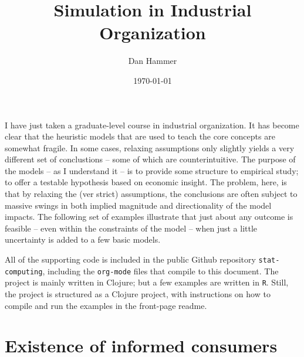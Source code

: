 \documentclass{article}
\title{Simulation in Industrial Organization}
\author{Dan Hammer}
\date{\today}
\begin{document}
\maketitle

\newcommand{\sss}{$s^2$ }
\newcommand{\R}{\texttt{R} }
\newcommand{\ep}{{\bf e}^\prime}
\newcommand{\e}{{\bf e}}
\newcommand{\Rs}{R^2}
\newcommand{\yp}{{\bf y}^\prime}
\newcommand{\y}{{\bf y}}
\newcommand{\X}{{\bf X}}
\newcommand{\Q}{{\bf Q}}
\newcommand{\J}{{\bf J}}
\newcommand{\Xp}{{\bf X}^{\prime}}
\newcommand{\Z}{{\bf Z}}
\newcommand{\Zp}{{\bf Z}^{\prime}}
\renewcommand{\P}{{\bf P}}
\renewcommand{\Pp}{{\bf P}^{\prime}}
\renewcommand{\In}{{\bf I}_n}
\newcommand{\Zin}{(\Zp\Z)^{-1}}
\newcommand{\E}{\mathbb{E}}
\newcommand{\V}{\mathbb{V}}
\newcommand{\sigs}{\sigma^2}

I have just taken a graduate-level course in industrial organization.  It has become clear that the heuristic models that are used to teach the core concepts are somewhat fragile.  In some cases, relaxing assumptions only slightly yields a very different set of conclustions -- some of which are counterintuitive.  The purpose of the models -- as I understand it -- is to provide some structure to empirical study; to offer a testable hypothesis based on economic insight.  The problem, here, is that by relaxing the (ver strict) assumptions, the conclusions are often subject to massive swings in both implied magnitude and directionality of the model impacts.  The following set of examples illustrate that just about any outcome is feasible -- even within the constraints of the model -- when just a little uncertainty is added to a few basic models.  

All of the supporting code is included in the public Github repository \texttt{stat-computing}, including the \texttt{org-mode} files that compile to this document.  The project is mainly written in Clojure; but a few examples are written in \texttt{R}.  Still, the project is structured as a Clojure project, with instructions on how to compile and run the examples in the front-page readme.

\section*{Existence of informed consumers}
\label{sec-1}
\end{document}
